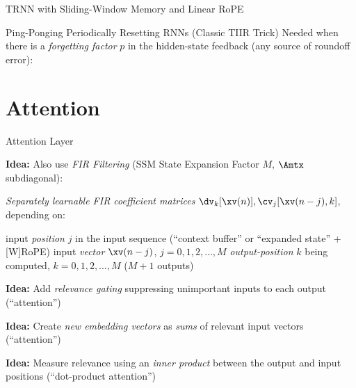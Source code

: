 \begin{slide}[\slideopts,toc={TIIR Sliding Window}]{TRNN with Sliding-Window Memory and Linear RoPE}
\end{slide}

\begin{slide}[\slideopts,toc={TIIR Resets}]{Ping-Ponging Periodically Resetting RNNs (Classic TIIR Trick)}
  \vspace{-1em}
  Needed when there is a \emph{forgetting factor} $p$ in the hidden-state feedback (any source of roundoff error):
  \vspace{-2em}
\maybepause
{}
\end{slide}

\section[\sectopts,toc={Attention}]{Attention}

\begin{slide}[\slideopts,toc={Attention}]{Attention Layer}

\vspace{-1em}

\textbf{Idea:} Also use \emph{FIR Filtering} (SSM State Expansion Factor $M$, $\Amtx$ subdiagonal):



\vspace{-1em}

\emph{Separately learnable FIR coefficient matrices} $\dv_k[\xv(n)], \cv_j[\xv(n-j),k]$, depending on:
  \begin{enumerate}
    \mpitem input \emph{position} $j$ in the input sequence (``context buffer'' or ``expanded state'' + [W]RoPE)
    \mpitem input \emph{vector} $\xv(n-j)$,\; $j=0,1,2,\dots,M$
    \mpitem \emph{output-position} $k$ being computed,\; $k=0,1,2,\dots,M$ ($M+1$ outputs)
  \end{enumerate}

\maybepause
\textbf{Idea:} Add \emph{relevance gating} suppressing unimportant inputs to each output (``attention'')

\vspace{0.2em}

\maybepause
\textbf{Idea:} Create \emph{new embedding vectors} as \emph{sums} of relevant input vectors (``attention'')

\vspace{0.2em}

\maybepause
\textbf{Idea:} Measure relevance using an \emph{inner product} between the output and input positions (``dot-product attention'')
\end{slide}

